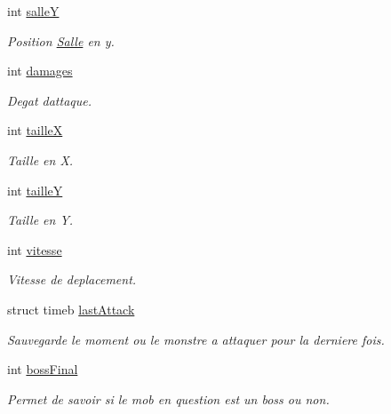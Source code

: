 \begin{DoxyCompactItemize}
\mbox{\label{structMonstre_a7896de4dda10aeeaa3a1349b52534e71}} 
int \hyperlink{structMonstre_a7896de4dda10aeeaa3a1349b52534e71}{salleY}
\begin{DoxyCompactList}\small\item\em Position \hyperlink{structSalle}{Salle} en y. \end{DoxyCompactList}\item 
\mbox{\label{structMonstre_a8a9d589fff02bd0db8c11e83196a2813}} 
int \hyperlink{structMonstre_a8a9d589fff02bd0db8c11e83196a2813}{damages}
\begin{DoxyCompactList}\small\item\em Degat d\textquotesingle{}attaque. \end{DoxyCompactList}\item 
\mbox{\label{structMonstre_ae9f0c1615082f13564bdcce2828ffca6}} 
int \hyperlink{structMonstre_ae9f0c1615082f13564bdcce2828ffca6}{tailleX}
\begin{DoxyCompactList}\small\item\em Taille en X. \end{DoxyCompactList}\item 
\mbox{\label{structMonstre_a99d52dc37af23ecc63a169bac174fc25}} 
int \hyperlink{structMonstre_a99d52dc37af23ecc63a169bac174fc25}{tailleY}
\begin{DoxyCompactList}\small\item\em Taille en Y. \end{DoxyCompactList}\item 
\mbox{\label{structMonstre_a18ca2cd0db1e599d8b1278af4d254571}} 
int \hyperlink{structMonstre_a18ca2cd0db1e599d8b1278af4d254571}{vitesse}
\begin{DoxyCompactList}\small\item\em Vitesse de deplacement. \end{DoxyCompactList}\item 
\mbox{\label{structMonstre_a5a5a2aeda32e7f2d655d79ba70e7f9da}} 
struct timeb \hyperlink{structMonstre_a5a5a2aeda32e7f2d655d79ba70e7f9da}{last\+Attack}
\begin{DoxyCompactList}\small\item\em Sauvegarde le moment ou le monstre a attaquer pour la derniere fois. \end{DoxyCompactList}\item 
\mbox{\label{structMonstre_a2cee8b79d1bb29823b9ce1fa4f1a6049}} 
int \hyperlink{structMonstre_a2cee8b79d1bb29823b9ce1fa4f1a6049}{boss\+Final}
\begin{DoxyCompactList}\small\item\em Permet de savoir si le mob en question est un boss ou non. \end{DoxyCompactList}\end{DoxyCompactItemize}


